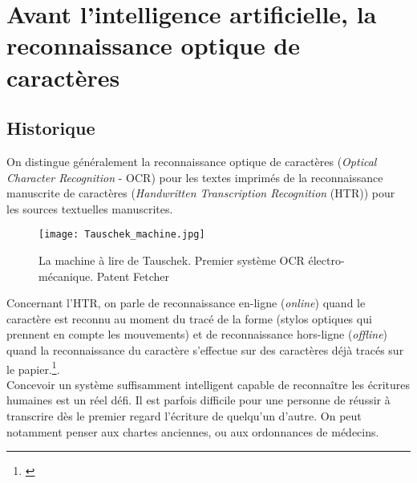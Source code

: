 \section{Avant l'intelligence artificielle, la reconnaissance optique de caractères}\label{Histoire_fonctionnement_HTR}

\subsection{Historique}

On distingue généralement la reconnaissance optique de caractères (\textit{Optical Character Recognition} - OCR)
pour les textes imprimés de la reconnaissance manuscrite de caractères (\textit{Handwritten Transcription Recognition} (HTR)) pour les sources textuelles manuscrites.\\

\begin{wrapfigure}[14]{r}{9cm}
    \centering
    \texttt{[image: Tauschek\_machine.jpg]}
    \caption{La machine à lire de Tauschek. Premier système OCR électro-mécanique. \textcopyright Patent Fetcher}
    \label{fig:tauschek_machine}
\end{wrapfigure}

Concernant l'HTR, on parle de reconnaissance en-ligne (\textit{online}) quand le caractère est reconnu au moment du tracé de la forme (stylos optiques qui prennent en compte les mouvements) et de reconnaissance hors-ligne (\textit{offline}) quand la reconnaissance du caractère s'effectue sur des caractères déjà tracés sur le papier.\footnote{\cite{eikvil_ocr_1993}}. \\

Concevoir un système suffisamment intelligent capable de reconnaître les écritures humaines est un réel défi. Il est parfois difficile pour une personne de réussir à transcrire dès le premier regard l'écriture de quelqu'un d'autre. On peut notamment penser aux chartes anciennes, ou aux ordonnances de médecins.\\

